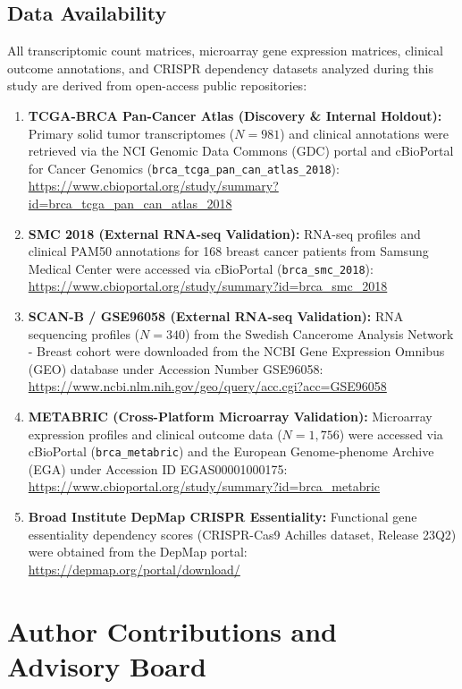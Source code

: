 \documentclass[10pt,a4paper,twocolumn]{article}
\begin{document}
\subsection{Data Availability}
All transcriptomic count matrices, microarray gene expression matrices, clinical outcome annotations, and CRISPR dependency datasets analyzed during this study are derived from open-access public repositories:
\begin{enumerate}
    \item \textbf{TCGA-BRCA Pan-Cancer Atlas (Discovery \& Internal Holdout):} Primary solid tumor transcriptomes ($N=981$) and clinical annotations were retrieved via the NCI Genomic Data Commons (GDC) portal and cBioPortal for Cancer Genomics (\texttt{brca\_tcga\_pan\_can\_atlas\_2018}): \url{https://www.cbioportal.org/study/summary?id=brca_tcga_pan_can_atlas_2018}
    \item \textbf{SMC 2018 (External RNA-seq Validation):} RNA-seq profiles and clinical PAM50 annotations for 168 breast cancer patients from Samsung Medical Center were accessed via cBioPortal (\texttt{brca\_smc\_2018}): \url{https://www.cbioportal.org/study/summary?id=brca_smc_2018}
    \item \textbf{SCAN-B / GSE96058 (External RNA-seq Validation):} RNA sequencing profiles ($N=340$) from the Swedish Cancerome Analysis Network - Breast cohort were downloaded from the NCBI Gene Expression Omnibus (GEO) database under Accession Number GSE96058: \url{https://www.ncbi.nlm.nih.gov/geo/query/acc.cgi?acc=GSE96058}
    \item \textbf{METABRIC (Cross-Platform Microarray Validation):} Microarray expression profiles and clinical outcome data ($N=1,756$) were accessed via cBioPortal (\texttt{brca\_metabric}) and the European Genome-phenome Archive (EGA) under Accession ID EGAS00001000175: \url{https://www.cbioportal.org/study/summary?id=brca_metabric}
    \item \textbf{Broad Institute DepMap CRISPR Essentiality:} Functional gene essentiality dependency scores (CRISPR-Cas9 Achilles dataset, Release 23Q2) were obtained from the DepMap portal: \url{https://depmap.org/portal/download/}
\end{enumerate}

\section*{Author Contributions and Advisory Board}
\end{document}

